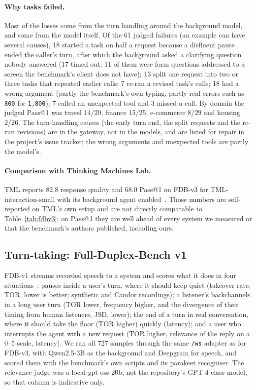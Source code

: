 \paragraph{Why tasks failed.} Most of the losses come from the turn handling around the background model,
and some from the model itself. Of the 61 judged failures (an example can have several causes), 18 started a task on half a
request because a disfluent pause ended the caller's turn, after which the background asked a clarifying
question nobody answered (17 timed out; 11 of them were form questions addressed to a screen the benchmark's
client does not have); 13 split one request into two or three tasks that repeated earlier calls; 7 re-ran a
revised task's calls; 18 had a wrong argument (partly the benchmark's own typing, partly real errors such as
\texttt{800} for \texttt{1,800}); 7 called an unexpected tool and 3 missed a call. By domain the judged
Pass@1 was travel 14/20, finance 15/25, e-commerce 8/29 and housing 2/26. The turn-handling causes (the
early turn end, the split requests and the re-run revisions) are in the gateway, not in the models, and are
listed for repair in the project's issue tracker; the wrong arguments and unexpected tools are partly the
model's.

\paragraph{Comparison with Thinking Machines Lab.} TML reports 82.8 response quality and 68.0 Pass@1 on FDB-v3
for TML-interaction-small with its background agent enabled~\citep{tml2026interaction}. Those numbers are
self-reported on TML's own setup and are not directly comparable to Table~\ref{tab:fdbv3}; on Pass@1 they are
well ahead of every system we measured or that the benchmark's authors published, including ours.

\subsection{Turn-taking: Full-Duplex-Bench v1}\label{sec:eval-v1}

FDB-v1 streams recorded speech to a system and scores what it does in four situations~\citep{lin2025fdbv1}:
pauses inside a user's turn, where it should keep quiet (takeover rate, TOR, lower is better; synthetic and
Candor recordings); a listener's backchannels in a long user turn (TOR lower, frequency higher, and the
divergence of their timing from human listeners, JSD, lower); the end of a turn in real conversation, where it
should take the floor (TOR higher) quickly (latency); and a user who interrupts the agent with a new request
(TOR higher, relevance of the reply on a 0--5 scale, latency). We ran all 727 samples through the same
\texttt{/ws} adapter as for FDB-v3, with Qwen2.5-3B as the background and Deepgram for speech, and scored them
with the benchmark's own scripts and its parakeet recogniser. The relevance judge was a local gpt-oss-20b, not
the repository's GPT-4-class model, so that column is indicative only.

